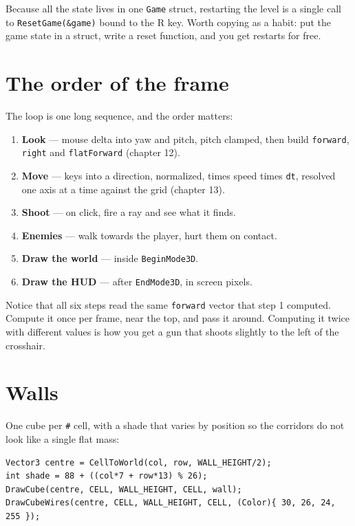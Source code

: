 Because all the state lives in one \lstinline|Game| struct, restarting the level
is a single call to \lstinline|ResetGame(&game)| bound to the R key. Worth
copying as a habit: put the game state in a struct, write a reset function, and
you get restarts for free.

\section{The order of the frame}

The loop is one long sequence, and the order matters:

\begin{enumerate}[leftmargin=*,itemsep=2pt]
  \item \textbf{Look} --- mouse delta into yaw and pitch, pitch clamped, then
        build \lstinline|forward|, \lstinline|right| and
        \lstinline|flatForward| (chapter 12).
  \item \textbf{Move} --- keys into a direction, normalized, times speed times
        \lstinline|dt|, resolved one axis at a time against the grid
        (chapter 13).
  \item \textbf{Shoot} --- on click, fire a ray and see what it finds.
  \item \textbf{Enemies} --- walk towards the player, hurt them on contact.
  \item \textbf{Draw the world} --- inside \lstinline|BeginMode3D|.
  \item \textbf{Draw the HUD} --- after \lstinline|EndMode3D|, in screen pixels.
\end{enumerate}

Notice that all six steps read the same \lstinline|forward| vector that step 1
computed. Compute it once per frame, near the top, and pass it around. Computing
it twice with different values is how you get a gun that shoots slightly to the
left of the crosshair.

\section{Walls}

One cube per \lstinline|#| cell, with a shade that varies by position so the
corridors do not look like a single flat mass:

\begin{lstlisting}
Vector3 centre = CellToWorld(col, row, WALL_HEIGHT/2);
int shade = 88 + ((col*7 + row*13) % 26);
DrawCube(centre, CELL, WALL_HEIGHT, CELL, wall);
DrawCubeWires(centre, CELL, WALL_HEIGHT, CELL, (Color){ 30, 26, 24, 255 });
\end{lstlisting}

